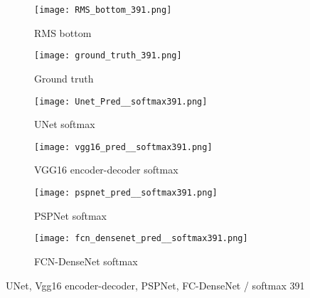 	\begin{figure}[!h]
		\centering
		\begin{subfigure}[b]{0.47\textwidth}
			\centering
			\texttt{[image: RMS\_bottom\_391.png]}
			\caption{RMS bottom}
			\label{fig:RMS_flat_shell_Vz_391}
		\end{subfigure}
		\hfill
		\begin{subfigure}[b]{0.47\textwidth}
			\centering
			\texttt{[image: ground\_truth\_391.png]}
			\caption{Ground truth}
			\label{fig:m1_rand_single_delam_391}
		\end{subfigure}
		\begin{subfigure}[b]{0.47\textwidth}
			\centering
			\texttt{[image: Unet\_Pred\_\_softmax391.png]}
			\caption{UNet softmax}
			\label{fig:Unet_Pred__softmax391}
		\end{subfigure}
		\hfill
		\begin{subfigure}[b]{0.47\textwidth}
			\centering
			\texttt{[image: vgg16\_pred\_\_softmax391.png]}
			\caption{VGG16 encoder-decoder softmax}			\label{fig:vgg16_pred__softmax391}			
		\end{subfigure}
		\hfill
		\begin{subfigure}[b]{0.47\textwidth}
			\centering
			\texttt{[image: pspnet\_pred\_\_softmax391.png]}
			\caption{PSPNet softmax}
			\label{fig:pspnet_pred__softmax391}
		\end{subfigure}	
		\hfill
		\begin{subfigure}[b]{0.47\textwidth}
			\centering
			\texttt{[image: fcn\_densenet\_pred\_\_softmax391.png]}
			\caption{FCN-DenseNet softmax}
			\label{fig:fcn_densenet_pred__softmax391}
		\end{subfigure}	
		\caption{UNet, Vgg16 encoder-decoder, PSPNet, FC-DenseNet / softmax 391}
		\label{fig:391_softmax}
	\end{figure}
